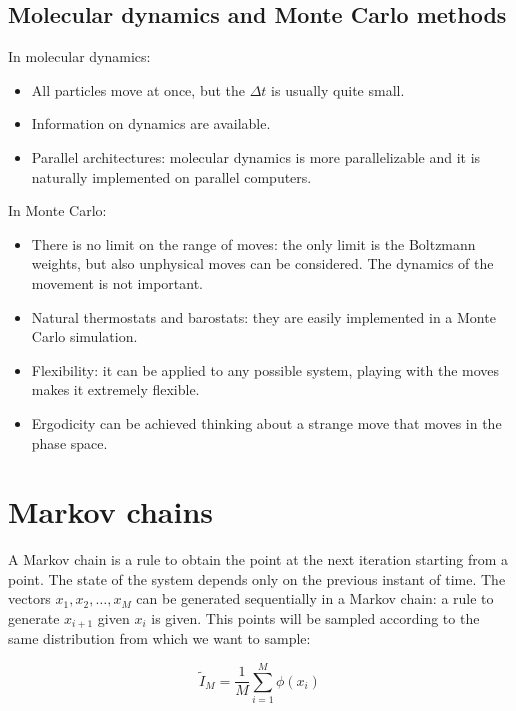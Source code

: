 	\subsection{Molecular dynamics and Monte Carlo methods}
	In molecular dynamics:

	\begin{multicols}{2}
		\begin{itemize}
			\item All particles move at once, but the $\Delta t$ is usually quite small.
			\item Information on dynamics are available.
			\item Parallel architectures: molecular dynamics is more parallelizable and it is naturally implemented on parallel computers.
		\end{itemize}
	\end{multicols}

	In Monte Carlo:

	\begin{multicols}{2}
		\begin{itemize}
			\item There is no limit on the range of moves: the only limit is the Boltzmann weights, but also unphysical moves can be considered.
				The dynamics of the movement is not important.
			\item Natural thermostats and barostats: they are easily implemented in a Monte Carlo simulation.
			\item Flexibility: it can be applied to any possible system, playing with the moves makes it extremely flexible.
			\item Ergodicity can be achieved thinking about a strange move that moves in the phase space.
		\end{itemize}
	\end{multicols}

\section{Markov chains}
A Markov chain is a rule to obtain the point at the next iteration starting from a point.
The state of the system depends only on the previous instant of time.
The vectors $x_1, x_2, \dots, x_M$ can be generated sequentially in a Markov chain: a rule to generate $x_{i+1}$ given $x_i$ is given.
This points will be sampled according to the same distribution from which we want to sample:

$$\tilde{I}_M = \frac{1}{M}\sum\limits_{i=1}^M\phi(x_i)$$

